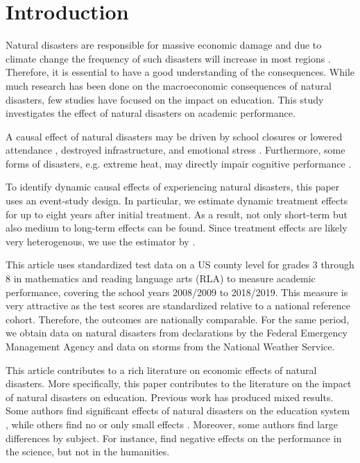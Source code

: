 
\section{Introduction}

Natural disasters are responsible for massive economic damage and due to climate change the frequency of such disasters will increase in most regions \citep{IPCC_2021}. Therefore, it is essential to have a good understanding of the consequences. While much research has been done on the macroeconomic consequences of natural disasters, few studies have focused on the impact on education. This study investigates the effect of natural disasters on academic performance.

A causal effect of natural disasters may be driven by school closures \citep{Grewening_2020} or lowered attendance \citep{Spencer_2016}, destroyed infrastructure, and emotional stress \citep{Vogel_2016}. Furthermore, some forms of disasters, e.g. extreme heat, may directly impair cognitive performance \citep{Ramsey_1995}.

To identify dynamic causal effects of experiencing natural disasters, this paper uses an event-study design. In particular, we estimate dynamic treatment effects for up to eight years after initial treatment. As a result, not only short-term but also medium to long-term effects can be found. Since treatment effects are likely very heterogenous, we use the estimator by \cite{Sun_2021}. 

This article uses standardized test data on a US county level for grades 3 through 8 in mathematics and reading language arts (RLA) to measure academic performance, covering the school years 2008/2009 to 2018/2019. This measure is very attractive as the test scores are standardized relative to a national reference cohort. Therefore, the outcomes are nationally comparable. For the same period, we obtain data on natural disasters from declarations by the Federal Emergency Management Agency and data on storms from the National Weather Service.

This article contributes to a rich literature on economic effects of natural disasters. More specifically, this paper contributes to the literature on the impact of natural disasters on education. Previous work has produced mixed results. Some authors find significant effects of natural disasters on the education system \citep{Holmes_2002, Cuaresma_2010, Sacerdote_2012, Goodman_2020}, while others find no or only small effects \citep{Baggerly_2008, Pane_2008}. Moreover, some authors find large differences by subject. For instance, \cite{Spencer_2016} find negative effects on the performance in the science, but not in the humanities.

